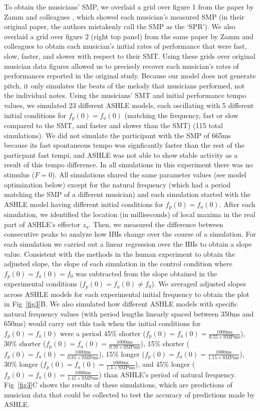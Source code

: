 \documentclass[10pt,letterpaper]{article}
\begin{document}
To obtain the musicians' SMP, we overlaid a grid over figure 1 from the paper by Zamm and colleagues \cite{zamm2018musicians}, which showed each musician's measured SMP (in their original paper, the authors mistakenly call the SMP as the `SPR'). We also overlaid a grid over figure 2 (right top panel) from the same paper by Zamm and colleagues to obtain each musician's initial rates of performance that were fast, slow, faster, and slower with respect to their SMT. Using these grids over original musician data figures allowed us to precisely recover each musician's rates of performances reported in the original study. Because our model does not generate pitch, it only simulates the beats of the melody that musicians performed, not the individual notes. Using the musicians' SMT and initial performance tempo values, we simulated 23 different ASHLE models, each oscillating with 5 different initial conditions for $f_p(0)=f_a(0)$ (matching the frequency, fast or slow compared to the SMT, and faster and slower than the SMT) (115 total simulations). We did not simulate the participant with the SMP of 665ms because its fast spontaneous tempo was signficantly faster than the rest of the particpant fast tempi, and ASHLE was not able to show stable activity as a result of this tempo difference. In all simulations in this experiment there was no stimulus ($F = 0$). All simulations shared the same parameter values (see model optimization below) except for the natural frequency (which had a period matching the SMP of a different musician) and each simulation started with the ASHLE model having different initial conditions for $f_p(0)=f_a(0)$. After each simulation, we identified the location (in milliseconds) of local maxima in the real part of ASHLE's effector $z_a$. Then, we measured the difference between consecutive peaks to analyze how IBIs change over the course of a simulation. For each simulation we carried out a linear regression over the IBIs to obtain a slope value. Consistent with the methods in the human experiment to obtain the adjusted slope, the slope of each simulation in the control condition where $f_p(0)=f_a(0)=f_0$ was subtracted from the slope obtained in the experimental conditions ($f_p(0)=f_a(0)\neq f_0$). We averaged adjusted slopes across ASHLE models for each experimental initial frequency to obtain the plot in Fig~\ref{fig3}B. We also simulated how different ASHLE models with specific natural frequency values (with period lengths linearly spaced between 350ms and 650ms) would carry out this task when the initial conditions for $f_p(0)=f_a(0)$ were a period 45\% shorter ($f_p(0)=f_a(0)=\frac{1000\text{ms}}{0.55 \times \text{SMPms}}$), 30\% shorter ($f_p(0)=f_a(0)=\frac{1000\text{ms}}{0.70 \times \text{SMPms}}$), 15\% shorter ($f_p(0)=f_a(0)=\frac{1000\text{ms}}{0.85 \times \text{SMPms}}$), 15\% longer ($f_p(0)=f_a(0)=\frac{1000\text{ms}}{1.15 \times \text{SMPms}}$), 30\% longer ($f_p(0)=f_a(0)=\frac{1000\text{ms}}{1.3 \times \text{SMPms}}$), and 45\% longer ($f_p(0)=f_a(0)=\frac{1000\text{ms}}{1.45 \times \text{SMPms}}$) than ASHLE's period of natural frequency. Fig~\ref{fig3}C shows the results of these simulations, which are predictions of musician data that could be collected to test the accuracy of predictions made by ASHLE.
\end{document}
